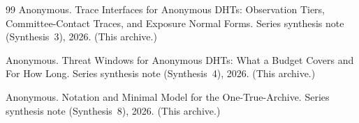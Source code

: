 \documentclass[11pt]{article}
\begin{document}
\begin{thebibliography}{99}
Anonymous.
\newblock Trace Interfaces for Anonymous {DHT}s: Observation Tiers, Committee-Contact Traces, and Exposure Normal Forms.
\newblock Series synthesis note (Synthesis~3), 2026. (This archive.)

Anonymous.
\newblock Threat Windows for Anonymous {DHT}s: What a Budget Covers and For How Long.
\newblock Series synthesis note (Synthesis~4), 2026. (This archive.)


Anonymous.
\newblock Notation and Minimal Model for the One-True-Archive.
\newblock Series synthesis note (Synthesis~8), 2026. (This archive.)

\end{thebibliography}
\end{document}
